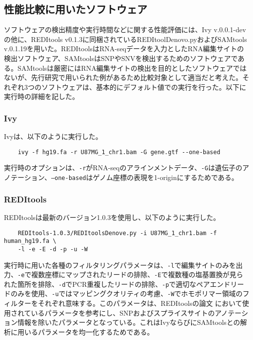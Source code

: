 \subsection{性能比較に用いたソフトウェア}
ソフトウェアの検出精度や実行時間などに関する性能評価には、Ivy v.0.0.1-devの他に、REDItools v0.1.3に同梱されているREDItoolDenovo.pyおよびSAMtools v.0.1.19を用いた。REDItoolsはRNA-seqデータを入力としたRNA編集サイトの検出ソフトウェア、SAMtoolsはSNPやSNVを検出するためのソフトウェアである。SAMtoolsは厳密にはRNA編集サイトの検出を目的としたソフトウェアではないが、先行研究で用いられた例があるため比較対象として適当だと考えた。それぞれ3つのソフトウェアは、基本的にデフォルト値での実行を行った。以下に実行時の詳細を記した。

\subsubsection{Ivy}
Ivyは、以下のように実行した。
{\small
\begin{verbatim}
	ivy -f hg19.fa -r U87MG_1_chr1.bam -G gene.gtf --one-based
\end{verbatim}
}
実行時のオプションは、\texttt{-r}がRNA-seqのアラインメントデータ、\texttt{-G}は遺伝子のアノテーション、\texttt{--one-based}はゲノム座標の表現を1-originにするためである。

\subsubsection{REDItools}
REDItoolsは最新のバージョン1.0.3を使用し、以下のように実行した。
{\small
\begin{verbatim}
	REDItools-1.0.3/REDItoolsDenove.py -i U87MG_1_chr1.bam -f human_hg19.fa \
	-l -e -E -d -p -u -W
\end{verbatim}
}
実行時に用いた各種のフィルタリングパラメータは、\texttt{-l}で編集サイトのみを出力、\texttt{-e}で複数座標にマップされたリードの排除、\texttt{-E}で複数種の塩基置換が見られた箇所を排除、\texttt{-d}でPCR重複したリードの排除、\texttt{-p}で適切なペアエンドリードのみを使用、\texttt{-u}ではマッピングクオリティの考慮、\texttt{-W}でホモポリマー領域のフィルターをそれぞれ意味する。このパラメータは、REDItoolsの論文 \cite{Picardi:2013aa}において使用されているパラメータを参考にし、SNPおよびスプライスサイトのアノテーション情報を除いたパラメータとなっている。これはIvyならびにSAMtoolsとの解析に用いるパラメータを均一化するためである。

